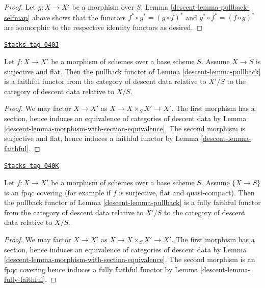 \begin{proof}

Let $g : X \to X'$ be a morphism over $S$.
Lemma \ref{descent-lemma-pullback-selfmap} above shows that the functors
$f^* \circ g^* = (g \circ f)^*$ and $g^* \circ f^* = (f \circ g)^*$
are isomorphic
to the respective identity functors as desired.
\end{proof}

\begin{lemma}
\label{descent-lemma-morphism-source-faithfully-flat}
\href{https://stacks.math.columbia.edu/tag/040J}{\texttt{Stacks tag 040J}}

Let $f : X \to X'$ be a morphism of schemes over a base scheme $S$.
Assume $X \to S$ is surjective and flat. Then the pullback functor
of Lemma \ref{descent-lemma-pullback} is a faithful functor
from the category of descent data relative to $X'/S$ to the
category of descent data relative to $X/S$.
\end{lemma}

\begin{proof}

We may factor $X \to X'$ as $X \to X \times_S X' \to X'$.
The first morphism has a section, hence induces an equivalence of
categories of descent data by
Lemma \ref{descent-lemma-morphism-with-section-equivalence}.
The second morphism is surjective and flat, hence induces a
faithful functor by Lemma \ref{descent-lemma-faithful}.
\end{proof}

\begin{lemma}
\label{descent-lemma-morphism-source-fpqc-covering}
\href{https://stacks.math.columbia.edu/tag/040K}{\texttt{Stacks tag 040K}}

Let $f : X \to X'$ be a morphism of schemes over a base scheme $S$.
Assume $\{X \to S\}$ is an fpqc covering (for example if $f$ is
surjective, flat and quasi-compact).
Then the pullback functor of Lemma \ref{descent-lemma-pullback} is a
fully faithful functor from the category of descent data relative
to $X'/S$ to the category of descent data relative to $X/S$.
\end{lemma}

\begin{proof}

We may factor $X \to X'$ as $X \to X \times_S X' \to X'$.
The first morphism has a section, hence induces an equivalence of
categories of descent data by
Lemma \ref{descent-lemma-morphism-with-section-equivalence}.
The second morphism is an fpqc covering
hence induces a fully faithful functor by Lemma \ref{descent-lemma-fully-faithful}.
\end{proof}

